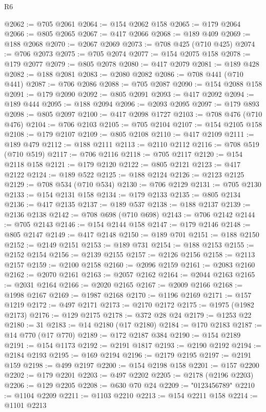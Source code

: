 \begin{lexlean}{R6}
\begin{coremodule}
{{{{{{{{{{{{{{{{{{{{{{{{{{{{{{{{{{{{{{{{{{{{{{{{{{{{{{{{{{{{{{{{{{{{{{{{@2062 := @705 @2061
@2064 := @154 @2062 @158
@2065 := @179 @2064
@2066 := @805 @2065
@2067 := @417 @2066
@2068 := @189 @409
@2069 := @188 @2068
@2070 := @2067 @2069
@2073 := @708 @425 (@710 @425)
@2074 := @706 @2073
@2075 := @705 @2074
@2077 := @154 @2075 @158
@2078 := @179 @2077
@2079 := @805 @2078
@2080 := @417 @2079
@2081 := @189 @428
@2082 := @188 @2081
@2083 := @2080 @2082
@2086 := @708 @441 (@710 @441)
@2087 := @706 @2086
@2088 := @705 @2087
@2090 := @154 @2088 @158
@2091 := @179 @2090
@2092 := @805 @2091
@2093 := @417 @2092
@2094 := @189 @444
@2095 := @188 @2094
@2096 := @2093 @2095
@2097 := @179 @893
@2098 := @805 @2097
@2100 := @417 @2098 @1727
@2103 := @708 @476 (@710 @476)
@2104 := @706 @2103
@2105 := @705 @2104
@2107 := @154 @2105 @158
@2108 := @179 @2107
@2109 := @805 @2108
@2110 := @417 @2109
@2111 := @189 @479
@2112 := @188 @2111
@2113 := @2110 @2112
@2116 := @708 @519 (@710 @519)
@2117 := @706 @2116
@2118 := @705 @2117
@2120 := @154 @2118 @158
@2121 := @179 @2120
@2122 := @805 @2121
@2123 := @417 @2122
@2124 := @189 @522
@2125 := @188 @2124
@2126 := @2123 @2125
@2129 := @708 @534 (@710 @534)
@2130 := @706 @2129
@2131 := @705 @2130
@2133 := @154 @2131 @158
@2134 := @179 @2133
@2135 := @805 @2134
@2136 := @417 @2135
@2137 := @189 @537
@2138 := @188 @2137
@2139 := @2136 @2138
@2142 := @708 @698 (@710 @698)
@2143 := @706 @2142
@2144 := @705 @2143
@2146 := @154 @2144 @158
@2147 := @179 @2146
@2148 := @805 @2147
@2149 := @417 @2148
@2150 := @189 @701
@2151 := @188 @2150
@2152 := @2149 @2151
@2153 := @189 @731
@2154 := @188 @2153
@2155 := @2152 @2154
@2156 := @2139 @2155
@2157 := @2126 @2156
@2158 := @2113 @2157
@2159 := @2100 @2158
@2160 := @2096 @2159
@2161 := @2083 @2160
@2162 := @2070 @2161
@2163 := @2057 @2162
@2164 := @2044 @2163
@2165 := @2031 @2164
@2166 := @2020 @2165
@2167 := @2009 @2166
@2168 := @1998 @2167
@2169 := @1987 @2168
@2170 := @1196 @2169
@2171 := @157 @1219
@2172 := @497 @2171
@2173 := @2170 @2172
@2175 := @1975 (@1982 @2173)
@2176 := @129 @2175
@2178 := @372 @28 @24
@2179 := @1253 @22
@2180 := 31
@2183 := @14 @2180 (@17 @2180)
@2184 := @170 @2183
@2187 := @14 @770 (@17 @770)
@2189 := @172 @2187 @384
@2190 := @154 @2189
@2191 := @154 @1173
@2192 := @2191 @1817
@2193 := @2190 @2192
@2194 := @2184 @2193
@2195 := @169 @2194
@2196 := @2179 @2195
@2197 := @2191 @159
@2198 := @499 @2197
@2200 := @154 @2198 @158
@2201 := @157 @2200
@2202 := @179 @2201
@2203 := @497 @2202
@2205 := @2178 (@2196 @2203)
@2206 := @129 @2205
@2208 := @630 @70 @24
@2209 := "0123456789"
@2210 := @1104 @2209
@2211 := @1103 @2210
@2213 := @154 @2211 @158
@2214 := @1101 @2213
}}}}}}}}}}}}}}}}}}}}}}}}}}}}}}}}}}}}}}}}}}}}}}}}}}}}}}}}}}}}}}}}}}}}}}}}
\end{coremodule}
\end{lexlean}
